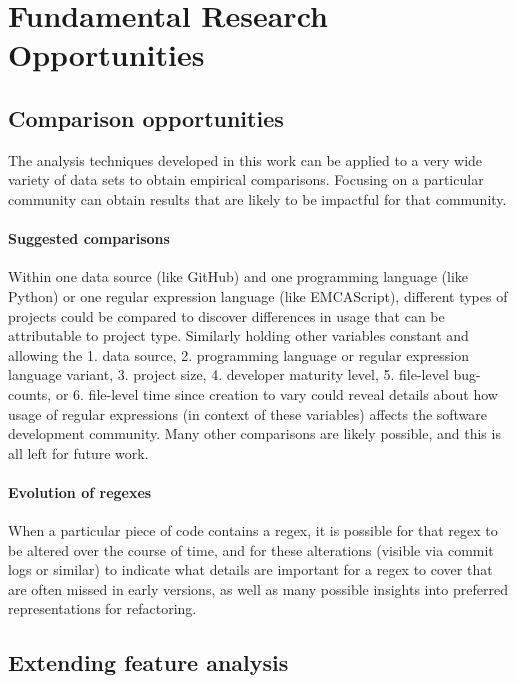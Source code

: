 \section{Fundamental Research Opportunities}

\subsection{Comparison opportunities}
The analysis techniques developed in this work can be applied to a very wide variety of data sets to obtain empirical comparisons.  Focusing on a particular community can obtain results that are likely to be impactful for that community.

\paragraph{Suggested comparisons}  Within one data source (like GitHub) and one programming language (like Python) or one regular expression language (like EMCAScript), different types of projects could be compared to discover differences in usage that can be attributable to project type.  Similarly holding other variables constant and allowing the 1. data source, 2. programming language or regular expression language variant, 3. project size, 4. developer maturity level, 5. file-level bug-counts,  or 6. file-level time since creation to vary could reveal details about how usage of regular expressions (in context of these variables) affects the software development community. Many other comparisons are likely possible, and this is all left for future work.

\paragraph{Evolution of regexes}  When a particular piece of code contains a regex, it is possible for that regex to be altered over the course of time, and for these alterations (visible via commit logs or similar) to indicate what details are important for a regex to cover that are often missed in early versions, as well as many possible insights into preferred representations for refactoring.


\subsection{Extending feature analysis}
